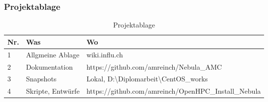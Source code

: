 \subsubsection{Projektablage}
\begin{table}[H]
\centering
\begin{tabular}{p{1cm}p{4cm}p{11cm}}
\hline
\rowcolor{heading}\textbf{Nr.} & \textbf{Was} & \textbf{Wo} \\\hline
1 & Allgmeine Ablage& wiki.influ.ch \\\hline
2 & Dokumentation & https://github.com/amreinch/Nebula\_AMC \\\hline
3 & Snapshots & Lokal, D:\textbackslash Diplomarbeit\textbackslash CentOS\_works \\\hline
4 & Skripte, Entwürfe & https://github.com/amreinch/OpenHPC\_Install\_Nebula \\\hline
\end{tabular}
\caption{Projektablage}
\end{table}

